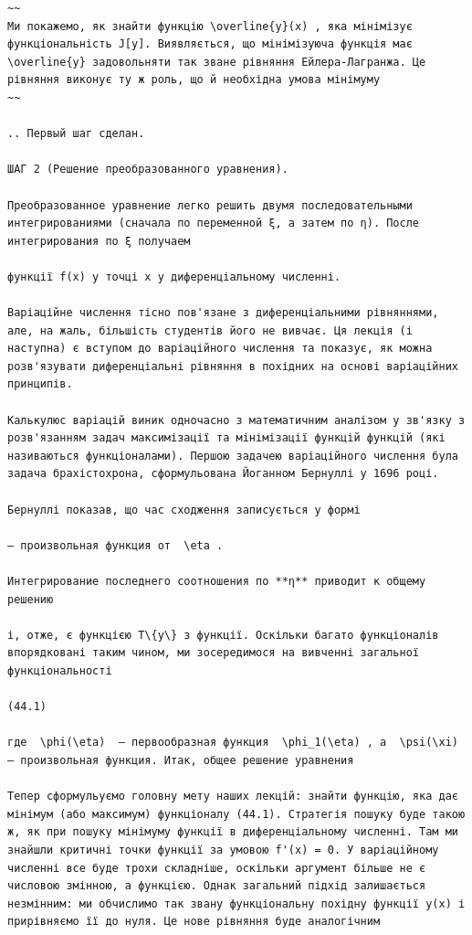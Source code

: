 \documentclass[
  ukrainian,
]{article}
\begin{document}
\begin{verbatim}
~~
Ми покажемо, як знайти функцію \overline{y}(x) , яка мінімізує функціональність J[y]. Виявляється, що мінімізуюча функція має \overline{y} задовольняти так зване рівняння Ейлера-Лагранжа. Це рівняння виконує ту ж роль, що й необхідна умова мінімуму
~~

.. Первый шаг сделан.

ШАГ 2 (Решение преобразованного уравнения).

Преобразованное уравнение легко решить двумя последовательными интегрированиями (сначала по переменной ξ, а затем по η). После интегрирования по ξ получаем

функції f(x) у точці x у диференціальному численні.

Варіаційне числення тісно пов'язане з диференціальними рівняннями, але, на жаль, більшість студентів його не вивчає. Ця лекція (і наступна) є вступом до варіаційного числення та показує, як можна розв'язувати диференціальні рівняння в похідних на основі варіаційних принципів.

Калькулюс варіацій виник одночасно з математичним аналізом у зв'язку з розв'язанням задач максимізації та мінімізації функцій функцій (які називаються функціоналами). Першою задачею варіаційного числення була задача брахістохрона, сформульована Йоганном Бернуллі у 1696 році.

Бернуллі показав, що час сходження записується у формі

— произвольная функция от  \eta .

Интегрирование последнего соотношения по **η** приводит к общему решению

і, отже, є функцією T\{y\} з функції. Оскільки багато функціоналів впорядковані таким чином, ми зосередимося на вивченні загальної функціональності

(44.1)

где  \phi(\eta)  — первообразная функция  \phi_1(\eta) , а  \psi(\xi)  — произвольная функция. Итак, общее решение уравнения

Тепер сформульуємо головну мету наших лекцій: знайти функцію, яка дає мінімум (або максимум) функціоналу (44.1). Стратегія пошуку буде такою ж, як при пошуку мінімуму функції в диференціальному численні. Там ми знайшли критичні точки функції за умовою f'(x) = 0. У варіаційному численні все буде трохи складніше, оскільки аргумент більше не є числовою змінною, а функцією. Однак загальний підхід залишається незмінним: ми обчислимо так звану функціональну похідну функції y(x) і прирівняємо її до нуля. Це нове рівняння буде аналогічним


\end{verbatim}
\end{document}
